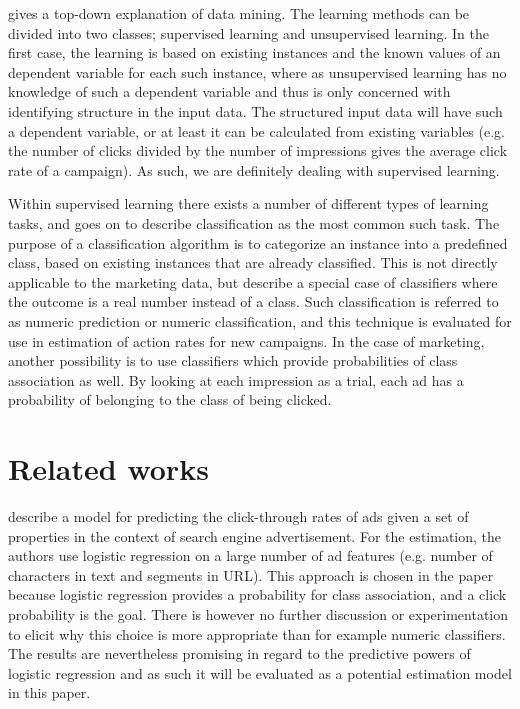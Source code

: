 \documentclass{sig-alternate}
\begin{document}
\cite{Kantardzic2011} gives a top-down explanation of data mining. The learning methods can be divided into two classes; supervised learning and unsupervised learning. In the first case, the learning is based on existing instances and the known values of an dependent variable for each such instance, where as unsupervised learning has no knowledge of such a dependent variable and thus is only concerned with identifying structure in the input data. The structured input data will have such a dependent variable, or at least it can be calculated from existing variables (e.g. the number of clicks divided by the number of impressions gives the average click rate of a campaign). As such, we are definitely dealing with supervised learning.

Within supervised learning there exists a number of different types of learning tasks, and \cite{Kantardzic2011} goes on to describe classification as the most common such task. The purpose of a classification algorithm is to categorize an instance into a predefined class, based on existing instances that are already classified. This is not directly applicable to the marketing data, but \citep{Witten2011} describe a special case of classifiers where the outcome is a real number instead of a class. Such classification is referred to as numeric prediction or numeric classification, and this technique is evaluated for use in estimation of action rates for new campaigns. In the case of marketing, another possibility is to use classifiers which provide probabilities of class association as well. By looking at each impression as a trial, each ad has a probability of belonging to the class of being clicked.

\section{Related works}
\label{ch:RelatedWorks}
\cite{Richardson2007} describe a model for predicting the click-through rates of ads given a set of properties in the context of search engine advertisement. For the estimation, the authors use logistic regression on a large number of ad features (e.g. number of characters in text and segments in URL). This approach is chosen in the paper because logistic regression provides a probability for class association, and a click probability is the goal. There is however no further discussion or experimentation to elicit why this choice is more appropriate than for example numeric classifiers. The results are nevertheless promising in regard to the predictive powers of logistic regression and as such it will be evaluated as a potential estimation model in this paper.
\end{document}

